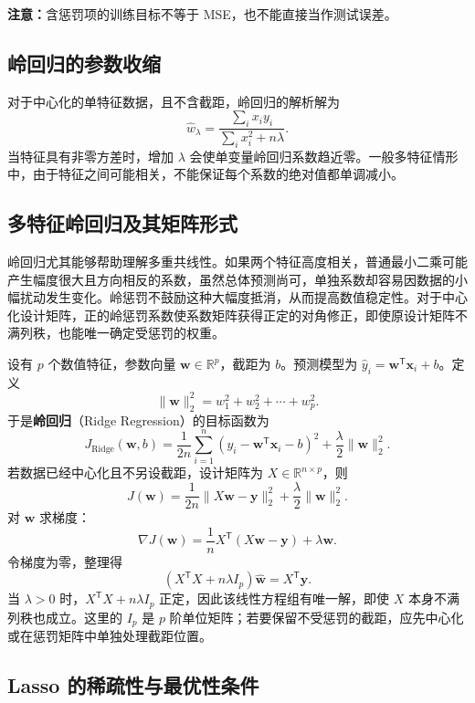 \textbf{注意：}含惩罚项的训练目标不等于 MSE，也不能直接当作测试误差。

\subsection{岭回归的参数收缩}

对于中心化的单特征数据，且不含截距，岭回归的解析解为
\[
\hat w_\lambda=\frac{\sum_i x_i y_i}{\sum_i x_i^2+n\lambda}.
\]
当特征具有非零方差时，增加 $\lambda$ 会使单变量岭回归系数趋近零。一般多特征情形中，由于特征之间可能相关，不能保证每个系数的绝对值都单调减小。

\subsection{多特征岭回归及其矩阵形式}

岭回归尤其能够帮助理解多重共线性。如果两个特征高度相关，普通最小二乘可能产生幅度很大且方向相反的系数，虽然总体预测尚可，单独系数却容易因数据的小幅扰动发生变化。岭惩罚不鼓励这种大幅度抵消，从而提高数值稳定性。对于中心化设计矩阵，正的岭惩罚系数使系数矩阵获得正定的对角修正，即使原设计矩阵不满列秩，也能唯一确定受惩罚的权重。

设有 $p$ 个数值特征，参数向量 $\boldsymbol w\in\mathbb R^p$，截距为 $b$。预测模型为 $\hat y_i=\boldsymbol w^{\mathsf T}\boldsymbol x_i+b$。定义
\[
\|\boldsymbol w\|_2^2=w_1^2+w_2^2+\cdots+w_p^2.
\]
于是\textbf{岭回归}（Ridge Regression）的目标函数为
\begin{equation}\label{eq:ridge-multivariate}
\boxed{J_{\mathrm{Ridge}}(\boldsymbol w,b)=
\frac1{2n}\sum_{i=1}^{n}
(y_i-\boldsymbol w^{\mathsf T}\boldsymbol x_i-b)^2+
\frac{\lambda}{2}\|\boldsymbol w\|_2^2.}
\end{equation}
若数据已经中心化且不另设截距，设计矩阵为 $X\in\mathbb R^{n\times p}$，则
\[
J(\boldsymbol w)=\frac1{2n}\|X\boldsymbol w-\boldsymbol y\|_2^2+
\frac{\lambda}{2}\|\boldsymbol w\|_2^2.
\]
对 $\boldsymbol w$ 求梯度：
\[
\nabla J(\boldsymbol w)=\frac1nX^{\mathsf T}(X\boldsymbol w-\boldsymbol y)+\lambda\boldsymbol w.
\]
令梯度为零，整理得
\begin{equation}\label{eq:ridge-normal}
(X^{\mathsf T}X+n\lambda I_p)\hat{\boldsymbol w}=X^{\mathsf T}\boldsymbol y.
\end{equation}
当 $\lambda>0$ 时，$X^{\mathsf T}X+n\lambda I_p$ 正定，因此该线性方程组有唯一解，即使 $X$ 本身不满列秩也成立。这里的 $I_p$ 是 $p$ 阶单位矩阵；若要保留不受惩罚的截距，应先中心化或在惩罚矩阵中单独处理截距位置。

\subsection{Lasso 的稀疏性与最优性条件}

